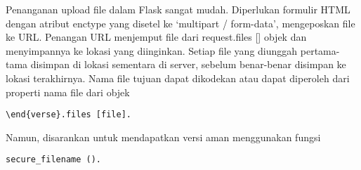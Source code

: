 \documentclass[12pt,a4paper]{article}
\begin{document}
Penanganan upload file dalam Flask sangat mudah. Diperlukan formulir HTML dengan atribut enctype yang disetel ke ‘multipart / form-data’, mengeposkan file ke URL. Penangan URL menjemput file dari request.files [] objek dan menyimpannya ke lokasi yang diinginkan. Setiap file yang diunggah pertama-tama disimpan di lokasi sementara di server, sebelum benar-benar disimpan ke lokasi terakhirnya. Nama file tujuan dapat dikodekan atau dapat diperoleh dari properti nama file dari objek 

\begin{verbatim}
\end{verse}.files [file]. 
\end{verbatim}
Namun, disarankan untuk mendapatkan versi aman menggunakan fungsi 


\begin{verbatim}
secure_filename ().
\end{verbatim}
\end{document}
